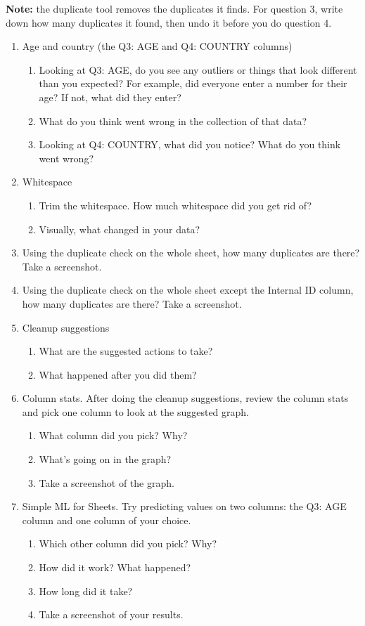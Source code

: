 \documentclass[12pt]{article}
\begin{document}
\textbf{Note:} the duplicate tool removes the duplicates it finds. For question 3, write down how many duplicates it found, then undo it before you do question 4.
\begin{enumerate}
    \item Age and country (the Q3: AGE and Q4: COUNTRY columns)
    \begin{enumerate}
        \item Looking at Q3: AGE, do you see any outliers or things that look different than you expected? For example, did everyone enter a number for their age? If not, what did they enter?
        \item What do you think went wrong in the collection of that data?
        \item Looking at Q4: COUNTRY, what did you notice? What do you think went wrong?
    \end{enumerate}
    \item Whitespace
    \begin{enumerate}
        \item Trim the whitespace. How much whitespace did you get rid of?
        \item Visually, what changed in your data?
    \end{enumerate}
    \item Using the duplicate check on the whole sheet, how many duplicates are there? Take a screenshot.
    \item Using the duplicate check on the whole sheet except the Internal ID column, how many duplicates are there? Take a screenshot.
    \item Cleanup suggestions
    \begin{enumerate}
        \item What are the suggested actions to take?
        \item What happened after you did them?
    \end{enumerate}
    \item Column stats. After doing the cleanup suggestions, review the column stats and pick one column to look at the suggested graph.
    \begin{enumerate}
        \item What column did you pick? Why?
        \item What's going on in the graph?
        \item Take a screenshot of the graph.
    \end{enumerate}
    \item Simple ML for Sheets. Try predicting values on two columns: the Q3: AGE column and one column of your choice.
    \begin{enumerate}
        \item Which other column did you pick? Why?
        \item How did it work? What happened?
        \item How long did it take?
        \item Take a screenshot of your results.
    \end{enumerate}
\end{enumerate}
\end{document}
